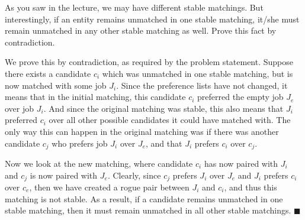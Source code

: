 \documentclass[11pt]{article}
\begin{document}
\begin{Parts}
\begin{solution}
  
  \end{solution}

\Part As you saw in the lecture, we may have different stable matchings. But
interestingly, if an entity remains unmatched in one stable matching, it/she
must remain unmatched in any other stable matching as well. %
Prove this fact by contradiction.

\begin{solution}
    We prove this by contradiction, as required by the problem statement. Suppose there exists a candidate $c_i$ which was unmatched in one stable matching, but is now matched with some job $J_i$. Since the preference lists have not changed, it means that in the initial matching, this candidate $c_i$ preferred the empty job $J_e$ over job $J_i$. And since the original matching was stable, this also means that $J_i$ preferred $c_i$ over all other possible candidates it could have matched with. The only way this can happen in the original matching was if there was another candidate $c_j$ who prefers job $J_i$ over $J_e$, and that $J_i$ prefers $c_i$ over $c_j$.

    Now we look at the new matching, where candidate $c_i$ has now paired with $J_i$ and $c_j$ is now paired with $J_e$. Clearly, since $c_j$ prefers $J_i$ over $J_e$ and $J_i$ prefers $c_i$ over $c_e$, then we have created a rogue pair between $J_i$ and $c_i$, and thus this matching is not stable. As a result, if a candidate remains unmatched in one stable matching, then it must remain unmatched in all other stable matchings. $\blacksquare$
\end{solution}

\end{Parts}
\end{document}
